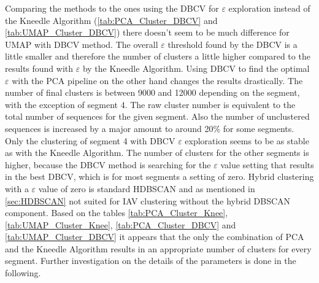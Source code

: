 Comparing the methods to the ones using the \gls{DBCV} for $\varepsilon$ exploration instead of the Kneedle Algorithm (\autoref{tab:PCA_Cluster_DBCV} and \autoref{tab:UMAP_Cluster_DBCV}) there doesn't seem to be much difference for \gls{UMAP} with \gls{DBCV} method. The overall $\varepsilon$ threshold found by the \gls{DBCV} is a little smaller and therefore the number of clusters a little higher compared to the results found with $\varepsilon$ by the Kneedle Algorithm. Using \gls{DBCV} to find the optimal $\varepsilon$ with the \gls{PCA} pipeline on the other hand changes the results drastically. The number of final clusters is between 9000 and 12000 depending on the segment, with the exception of segment 4. The raw cluster number is equivalent to the total number of sequences for the given segment. Also the number of unclustered sequences is increased by a major amount to around 20\% for some segments. Only the clustering of segment 4 with \gls{DBCV} $\varepsilon$ exploration seems to be as stable as with the Kneedle Algorithm. The number of clusters for the other segments is higher, because the \gls{DBCV} method is searching for the $\varepsilon$ value setting that results in the best \gls{DBCV}, which is for most segments a setting of zero. Hybrid clustering with a $\varepsilon$ value of zero is standard \gls{HDBSCAN} and as mentioned in \autoref{sec:HDBSCAN} not suited for \gls{IAV} clustering without the hybrid \gls{DBSCAN} component. Based on the tables \autoref{tab:PCA_Cluster_Knee}, \autoref{tab:UMAP_Cluster_Knee}, \autoref{tab:PCA_Cluster_DBCV} and \autoref{tab:UMAP_Cluster_DBCV} it appears that the only the combination of \gls{PCA} and the Kneedle Algorithm results in an appropriate number of clusters for every segment. Further investigation on the details of the parameters is done in the following.

